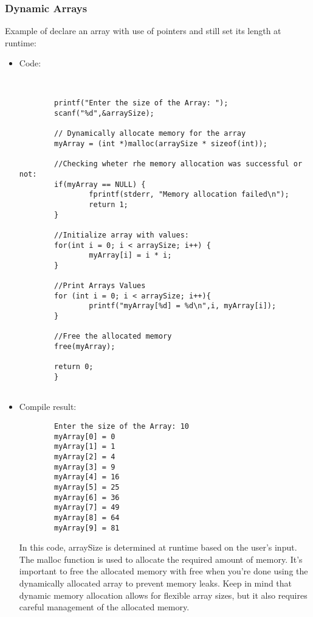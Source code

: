       \subsubsection{Dynamic Arrays}
      Example of declare an array with use of pointers and still set its length at runtime:
      \begin{itemize}
      \item Code:
      \begin{lstlisting}
        
        
        printf("Enter the size of the Array: ");
        scanf("%d",&arraySize);

        // Dynamically allocate memory for the array
        myArray = (int *)malloc(arraySize * sizeof(int));

        //Checking wheter rhe memory allocation was successful or not:
        if(myArray == NULL) {
                fprintf(stderr, "Memory allocation failed\n");
                return 1;
        }

        //Initialize array with values:
        for(int i = 0; i < arraySize; i++) {
                myArray[i] = i * i;
        }

        //Print Arrays Values
        for (int i = 0; i < arraySize; i++){
                printf("myArray[%d] = %d\n",i, myArray[i]);
        }

        //Free the allocated memory
        free(myArray);

        return 0;
        }
    
      \end{lstlisting}
      \item Compile result:
      \begin{lstlisting}
        Enter the size of the Array: 10
        myArray[0] = 0
        myArray[1] = 1
        myArray[2] = 4
        myArray[3] = 9
        myArray[4] = 16
        myArray[5] = 25
        myArray[6] = 36
        myArray[7] = 49
        myArray[8] = 64
        myArray[9] = 81
      \end{lstlisting}
      In this code, arraySize is determined at runtime based on the user’s input. The malloc function is used to allocate the required amount of memory. It’s important to free the allocated memory with free when you’re done using the dynamically allocated array to prevent memory leaks.
      Keep in mind that dynamic memory allocation allows for flexible array sizes, but it also requires careful management of the allocated memory.




\end{itemize}
